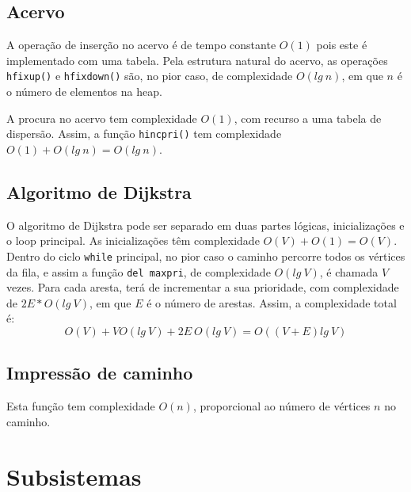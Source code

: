 \documentclass[portuguese, a4paper]{article}
\newcommand\tu[0]{\textunderscore}
\begin{document}
	\subsection{Acervo}
	\par
	A operação de inserção no acervo é de tempo constante $O(1)$ pois este é
	implementado com uma tabela. Pela estrutura natural do acervo, as operações
	\texttt{h\tu fixup()} e \texttt{h\tu fixdown()} são, no pior caso, de
	complexidade $O(lg~n)$, em que $n$ é o número de elementos na heap.
	\par
	A procura no acervo tem complexidade $O(1)$, com recurso a uma tabela de
	dispersão. Assim, a função \texttt{h\tu inc\tu pri()} tem complexidade
	$O(1) + O(lg~n) = O(lg~n)$.

	\subsection{Algoritmo de Dijkstra}
	\par
	O algoritmo de Dijkstra pode ser separado em duas partes lógicas,
	inicializações e o loop principal. As inicializações têm complexidade $O(V)
	+ O(1) = O(V)$.  Dentro do ciclo \texttt{while} principal, no pior caso o
	caminho percorre todos os vértices da fila, e assim a função \texttt{del\tu
	max\tu pri}, de complexidade $O(lg~V)$, é chamada $V$ vezes. Para cada
	aresta, terá de incrementar a sua prioridade, com complexidade de $2E *
	O(lg~V)$, em que $E$ é o número de arestas. Assim, a complexidade total é:
	\cite{randompdf}
	$$O(V) + VO(lg~V) + 2E~O(lg~V) = O((V + E)lg~V)$$

	\subsection{Impressão de caminho}
	\par
	Esta função tem complexidade $O(n)$, proporcional ao número de vértices $n$
	no caminho.


\section{Subsistemas}
\end{document}
